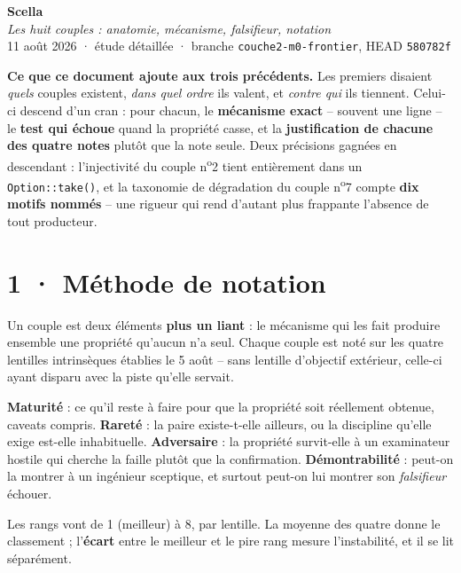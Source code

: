 \documentclass[10pt]{article}
\newcommand{\code}[1]{\texttt{\small #1}}
\begin{document}
\begin{center}
{\Huge\bfseries\color{navy} Scella}\\[4pt]
{\large\color{grey}\itshape Les huit couples : anatomie, mécanisme, falsifieur, notation}\\[4pt]
{\small\color{grey} 11 août 2026 \; · \; étude détaillée \; · \; branche \code{couche2-m0-frontier}, HEAD \code{580782f}}
\end{center}
\vspace{2pt}

\begin{these}
\textbf{Ce que ce document ajoute aux trois précédents.} Les premiers disaient \emph{quels} couples
existent, \emph{dans quel ordre} ils valent, et \emph{contre qui} ils tiennent. Celui-ci descend d'un
cran : pour chacun, le \textbf{mécanisme exact} -- souvent une ligne -- le \textbf{test qui échoue}
quand la propriété casse, et la \textbf{justification de chacune des quatre notes} plutôt que la note
seule. Deux précisions gagnées en descendant : l'injectivité du couple n\textsuperscript{o}2 tient
entièrement dans un \code{Option::take()}, et la taxonomie de dégradation du couple
n\textsuperscript{o}7 compte \textbf{dix motifs nommés} -- une rigueur qui rend d'autant plus
frappante l'absence de tout producteur.
\end{these}

\section{1 · Méthode de notation}

Un couple est deux éléments \textbf{plus un liant} : le mécanisme qui les fait produire ensemble une
propriété qu'aucun n'a seul. Chaque couple est noté sur les quatre lentilles intrinsèques établies le
5 août -- sans lentille d'objectif extérieur, celle-ci ayant disparu avec la piste qu'elle servait.

\textbf{Maturité} : ce qu'il reste à faire pour que la propriété soit réellement obtenue, caveats
compris. \textbf{Rareté} : la paire existe-t-elle ailleurs, ou la discipline qu'elle exige est-elle
inhabituelle. \textbf{Adversaire} : la propriété survit-elle à un examinateur hostile qui cherche la
faille plutôt que la confirmation. \textbf{Démontrabilité} : peut-on la montrer à un ingénieur
sceptique, et surtout peut-on lui montrer son \emph{falsifieur} échouer.

Les rangs vont de 1 (meilleur) à 8, par lentille. La moyenne des quatre donne le classement ;
l'\textbf{écart} entre le meilleur et le pire rang mesure l'instabilité, et il se lit séparément.
\end{document}
